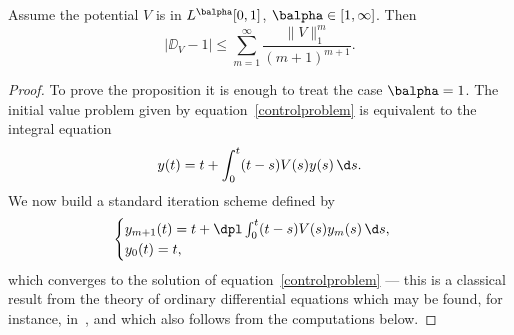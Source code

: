 \begin{prop}\label{thmupperbound}
Assume the potential $V$ is in $L^{\balpha}[0,1]$, $\balpha \in [1,\infty]$.
Then
\[
\left| \DD_V-1\right|\leq \sum_{m=1}^{\infty} \frac{ \|V\|_{1}^{m}}{ (m+1)^{m+1}}.
\]
\end{prop}
\begin{proof}
To prove the proposition it is enough to treat the case $\balpha=1$.
The initial value problem given by equation~\eqref{controlproblem} is equivalent to the integral equation
\[
y(t) = t + {\int_{0}^{t}}(t-s)V(s)y(s) \, \d s.
\]
We now build a standard iteration scheme defined by
\begin{equation}\label{iterationsch}
\begin{cases}
y_{m+1}(t)=t+\dpl\int_{0}^{t}(t-s)V(s)y_{m}(s) \, \d s,\\
y_{0}(t)=t,
\end{cases}
\end{equation}
which converges to the solution of equation~\eqref{controlproblem} --- this is a classical result from the theory of ordinary differential
equations which may be found, for instance, in~\cite{CL}, and which also follows from the computations below.


\end{proof}
